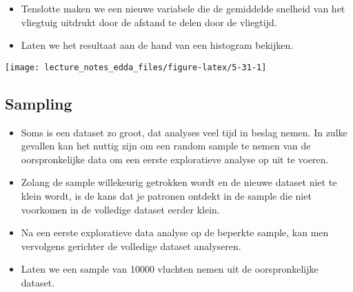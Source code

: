 \documentclass[]{memoir}
\newenvironment{Shaded}{\begin{snugshade}}{\end{snugshade}}
\newcommand{\KeywordTok}[1]{\textcolor[rgb]{0.13,0.29,0.53}{\textbf{#1}}}
\newcommand{\DataTypeTok}[1]{\textcolor[rgb]{0.13,0.29,0.53}{#1}}
\newcommand{\DecValTok}[1]{\textcolor[rgb]{0.00,0.00,0.81}{#1}}
\newcommand{\StringTok}[1]{\textcolor[rgb]{0.31,0.60,0.02}{#1}}
\newcommand{\OperatorTok}[1]{\textcolor[rgb]{0.81,0.36,0.00}{\textbf{#1}}}
\newcommand{\NormalTok}[1]{#1}
\providecommand{\tightlist}{%
  \setlength{\itemsep}{0pt}\setlength{\parskip}{0pt}}
\begin{document}
\begin{itemize}
\tightlist
\item
  Tenslotte maken we een nieuwe variabele die de gemiddelde snelheid van
  het vliegtuig uitdrukt door de afstand te delen door de vliegtijd.
\end{itemize}

\begin{Shaded}
\end{Shaded}

\begin{itemize}
\tightlist
\item
  Laten we het resultaat aan de hand van een histogram bekijken.
\end{itemize}

\texttt{[image: lecture\_notes\_edda\_files/figure-latex/5-31-1]}

\subsection{Sampling}\label{sampling}

\begin{itemize}
\tightlist
\item
  Soms is een dataset zo groot, dat analyses veel tijd in beslag nemen.
  In zulke gevallen kan het nuttig zijn om een random sample te nemen
  van de oorspronkelijke data om een eerste exploratieve analyse op uit
  te voeren.
\item
  Zolang de sample willekeurig getrokken wordt en de nieuwe dataset niet
  te klein wordt, is de kans dat je patronen ontdekt in de sample die
  niet voorkomen in de volledige dataset eerder klein.
\item
  Na een eerste exploratieve data analyse op de beperkte sample, kan men
  vervolgens gerichter de volledige dataset analyseren.
\item
  Laten we een sample van 10000 vluchten nemen uit de oorspronkelijke
  dataset.
\end{itemize}

\begin{Shaded}
\end{Shaded}
\end{document}
